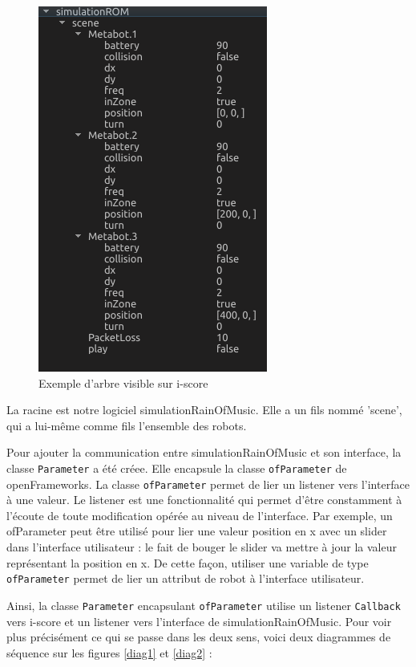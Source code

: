 \begin{figure}[H]
\centering
\includegraphics[scale=0.7]{imgs/tree}
\caption{Exemple d'arbre visible sur i-score}
\label{tr}
\end{figure}

La racine est notre logiciel simulationRainOfMusic. Elle a un fils nommé 'scene', qui a lui-même comme fils l'ensemble des robots.

Pour ajouter la communication entre simulationRainOfMusic et son interface, la classe \verb|Parameter| a été créee. Elle encapsule la classe \verb|ofParameter| de openFrameworks. La classe \verb|ofParameter| permet de lier un listener vers l'interface à une valeur. Le listener est une fonctionnalité qui permet d'être constamment à l'écoute de toute modification opérée au niveau de l'interface. Par exemple, un ofParameter peut être utilisé pour lier une valeur position en x avec un slider dans l'interface utilisateur : le fait de bouger le slider va mettre à jour la valeur représentant la position en x. De cette façon, utiliser une variable de type \verb|ofParameter| permet de lier un attribut de robot à l'interface utilisateur. 

Ainsi, la classe \verb|Parameter| encapsulant \verb|ofParameter| utilise un listener \verb|Callback| vers i-score et un listener vers l'interface de simulationRainOfMusic. Pour voir plus précisément ce qui se passe dans les deux sens, voici deux diagrammes de séquence sur les figures \ref{diag1} et \ref{diag2} :

